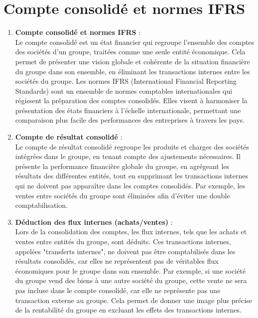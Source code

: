 \documentclass[a4paper, 12pt]{report}
\begin{document}
\section{Compte consolidé et normes IFRS}

\begin{enumerate}
	\item \textbf{Compte consolidé et normes IFRS} :\\
	Le compte consolidé est un état financier qui regroupe l'ensemble des comptes des sociétés d'un groupe, traitées comme une seule entité économique. Cela permet de présenter une vision globale et cohérente de la situation financière du groupe dans son ensemble, en éliminant les transactions internes entre les sociétés du groupe. Les normes IFRS (International Financial Reporting Standards) sont un ensemble de normes comptables internationales qui régissent la préparation des comptes consolidés. Elles visent à harmoniser la présentation des états financiers à l'échelle internationale, permettant une comparaison plus facile des performances des entreprises à travers les pays.
	
	\item \textbf{Compte de résultat consolidé} :\\
	Le compte de résultat consolidé regroupe les produits et charges des sociétés intégrées dans le groupe, en tenant compte des ajustements nécessaires. Il présente la performance financière globale du groupe, en agrégeant les résultats des différentes entités, tout en supprimant les transactions internes qui ne doivent pas apparaître dans les comptes consolidés. Par exemple, les ventes entre sociétés du groupe sont éliminées afin d’éviter une double comptabilisation.
	
	\item \textbf{Déduction des flux internes (achats/ventes)} :\\
	Lors de la consolidation des comptes, les flux internes, tels que les achats et ventes entre entités du groupe, sont déduits. Ces transactions internes, appelées "transferts internes", ne doivent pas être comptabilisés dans les résultats consolidés, car elles ne représentent pas de véritables flux économiques pour le groupe dans son ensemble. Par exemple, si une société du groupe vend des biens à une autre société du groupe, cette vente ne sera pas incluse dans le compte consolidé, car elle ne représente pas une transaction externe au groupe. Cela permet de donner une image plus précise de la rentabilité du groupe en excluant les effets des transactions internes.
\end{enumerate}
\end{document}
